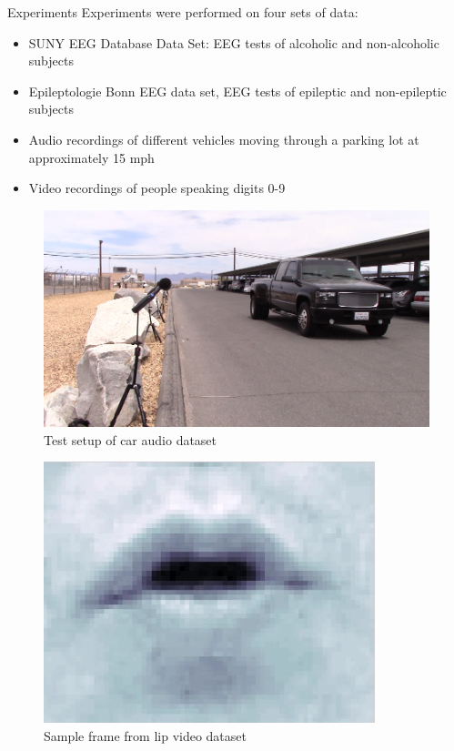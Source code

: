 \documentclass[final]{beamer}
\newlength{\onecolwid}
\begin{document}
\begin{frame}[t]
\begin{columns}[t]
\begin{column}{\onecolwid}

\begin{block}{Experiments}
    Experiments were performed on four sets of data:
    \begin{itemize}
        \item SUNY EEG Database Data Set: EEG tests of alcoholic and non-alcoholic subjects
            \cite{zhang_event_1995}
        \item Epileptologie Bonn EEG data set, EEG tests of epileptic and non-epileptic subjects
            \cite{andrzejak_indications_2001}
        \item Audio recordings of different vehicles moving through a parking lot at approximately
            15 mph \cite{sunu_dimensionality_2018}
        \item Video recordings of people speaking digits 0-9 \cite{lieu_signal_2011}
    \end{itemize}


    \begin{figure}
        \includegraphics[width=0.8\linewidth]{images/car.png}
        \caption{Test setup of car audio dataset}
    \end{figure}

    \begin{figure}
        \includegraphics[width=0.6\linewidth]{images/lip.png}
        \caption{Sample frame from lip video dataset}
    \end{figure}
\end{block}


\end{column}
\end{columns}
\end{frame}
\end{document}
